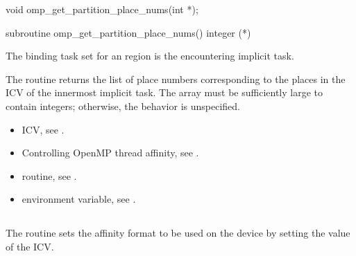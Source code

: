 \format
\begin{ccppspecific}
\begin{ompcFunction}
void omp_get_partition_place_nums(int *);
\end{ompcFunction}
\end{ccppspecific}

\begin{fortranspecific}
\begin{ompfSubroutine}
subroutine omp_get_partition_place_nums()
integer (*)
\end{ompfSubroutine}
\end{fortranspecific}

\binding
The binding task set for an  region is the encountering implicit task.

\effect
The  routine returns the list of
place numbers corresponding to the places in the 
ICV of the innermost implicit task. The array must be sufficiently large
to contain  integers; otherwise,
the behavior is unspecified.

\crossreferences
\begin{itemize}
\item {} ICV, see
.

\item Controlling OpenMP thread affinity, see
.

\item {} routine, see
.

\item {} environment variable, see
.
\end{itemize}

\subsection{}
\label{subsec:omp_set_affinity_format}

\summary
The  routine sets the affinity format to be used on the device
by setting the value of the  ICV.

